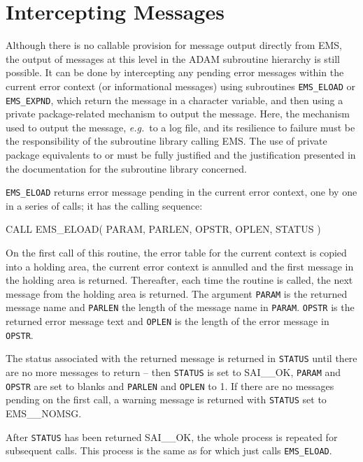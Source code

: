 \documentclass[twoside,11pt]{starlink}
\begin{document}
\section{\label{intercepting_messages}Intercepting Messages}
Although there is no callable provision for message output directly from
EMS, the  output of messages at this level in the ADAM subroutine hierarchy is
still possible.
It can be done by intercepting any pending error messages within the current
error context (or informational messages) using subroutines \texttt{EMS\_ELOAD}
or
\texttt{EMS\_EXPND}, which return the message in a character variable, and then
using a private package-related mechanism to output the message.
Here, the mechanism used to output the message, \textit{e.g.}\ to a log file,
and its resilience to failure must be the responsibility of the subroutine
library calling EMS.
The use of private package equivalents to
or
must be fully justified and the justification presented in the documentation
for the subroutine library concerned.

\texttt{EMS\_ELOAD} returns error message pending in the current error context,
one by one in a series of calls; it has the calling sequence:
\begin{terminalv}
CALL EMS_ELOAD( PARAM, PARLEN, OPSTR, OPLEN, STATUS )
\end{terminalv}
On the first call of this routine, the error table for the current
context is copied into a holding area, the current error context
is annulled and the first message in the holding area is returned.
Thereafter, each time the routine is called, the next message from
the holding area is returned.
The argument \texttt{PARAM} is the returned message name and \texttt{PARLEN}
the length of the message name in \texttt{PARAM}.
\texttt{OPSTR} is the returned error message text and \texttt{OPLEN} is the
length of the error message in \texttt{OPSTR}.

The status associated with the returned message is returned in \texttt{STATUS}
until there are no more messages to return -- then \texttt{STATUS} is set to
SAI\_\_OK, \texttt{PARAM} and \texttt{OPSTR} are set to blanks and
\texttt{PARLEN} and \texttt{OPLEN} to 1.
If there are no messages pending on the first call, a warning message
is returned with \texttt{STATUS} set to EMS\_\_NOMSG.

After \texttt{STATUS} has been returned SAI\_\_OK, the whole process is
repeated for subsequent calls.
This process is the same as for
which just calls \texttt{EMS\_ELOAD}.
\end{document}
